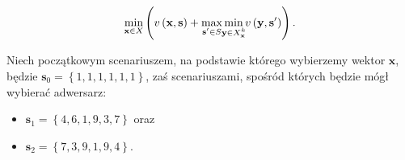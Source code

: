 \begin{equation}\label{eq:rimstdef}
	\min_{\mathclap{\textbf{x} \in X}} \left( v \left( \textbf{x}, \textbf{s} \right) + \max_{\mathclap{\textbf{s}^{\prime} \in S}} \min_{\mathclap{\textbf{y} \in X^{k}_{\textbf{x}}}} v \left( \textbf{y}, \textbf{s}^{\prime} \right) \right)\text{.}
\end{equation}

Niech początkowym scenariuszem, na podstawie którego wybierzemy wektor $\textbf{x}$, będzie $\textbf{s}_{0} = \left\{ 1, 1, 1, 1, 1, 1 \right\}$, zaś scenariuszami, spośród których będzie mógł wybierać adwersarz:

\begin{itemize}
	\item $\textbf{s}_{1} = \left\{ 4, 6, 1, 9, 3, 7 \right\}$ oraz
	\item $\textbf{s}_{2} = \left\{ 7, 3, 9, 1, 9, 4 \right\}$.
\end{itemize}

